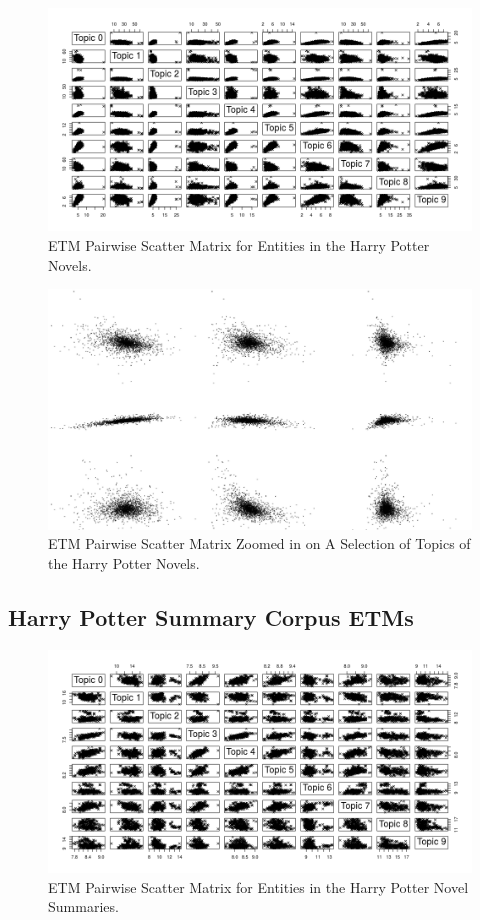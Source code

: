 \documentclass[10pt]{report}
\begin{document}
\begin{figure}[h!]
  \centering
  \includegraphics[scale=0.5]{hp_full_etms}
  \caption{ETM Pairwise Scatter Matrix for Entities in the Harry Potter Novels.\label{fig:hp_etm}}
\end{figure}

\begin{figure}[h!]
  \centering
  \includegraphics[scale=0.10]{hp_full_etm_closeup}
  \caption{ETM Pairwise Scatter Matrix Zoomed in on A Selection of Topics of the Harry Potter Novels. \label{fig:etm_closeup}}
\end{figure}


\clearpage
\subsection{Harry Potter Summary Corpus ETMs}

\begin{figure}[h!]
  \centering
  \includegraphics[scale=0.5]{hp_etms_summary}
  \caption{ETM Pairwise Scatter Matrix for Entities in the Harry Potter Novel Summaries.\label{fig:hp_summary_etm}}
\end{figure}
\end{document}
